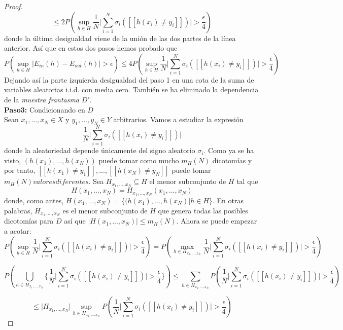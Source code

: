 \begin{proof}
\[ \leq 2P \left( \sup_{h \in H} \frac{1}{N} \bigg\vert \sum_{i=1}^{N} \sigma_{i} ( [[ h(x_{i}) \neq y_{i} ]])\bigg\vert > \frac{\epsilon}{4} \right)\]
donde la última desigualdad viene de la unión de las dos partes de la línea anterior. Así que en estos dos pasos hemos probado que
\[ P \left( \sup_{h \in H} \vert E_{in}(h)-E_{out}(h) \vert >\epsilon \right) \leq 4P \left( \sup_{h \in H} \frac{1}{N} \bigg\vert \sum_{i=1}^{N} \sigma_{i} ( [[ h(x_{i}) \neq y_{i} ]])\bigg\vert > \frac{\epsilon}{4} \right) \]
Dejando así la parte izquierda desigualdad del paso 1 en una cota de la suma de variables aleatorias i.i.d. con media cero. También se ha eliminado la dependencia de la \textit{muestra frantasma} $D'$.\\ 
\textbf{Paso3:} Condicionando en $D$\\
Sean $x_{1},...,x_{N} \in X$ y $y_{1},...,y_{N} \in Y$ arbitrarios. Vamos a estudiar la expresión
\[ \frac{1}{N} \bigg\vert \sum_{i=1}^{N} \sigma_{i} ( [[ h(x_{i}) \neq y_{i} ]])\bigg\vert \]
donde la aleatoriedad depende únicamente del signo aleatorio $\sigma_{i}$. Como ya se ha visto, $(h(x_{1}),..., h(x_{N}))$ puede tomar como mucho $m_{H}(N)$ dicotomías y por tanto, $[[ h(x_{1}) \neq y_{1} ]],...,[[ h(x_{N}) \neq y_{N} ]]$ puede tomar $m_{H}(N) valores diferentes$. Sea $H_{x_{1},...,x_{N}} \subseteq H$ el menor subconjunto de $H$ tal que
\[ H(x_{1},...,x_{N})=H_{x_{1},...,x_{N}}(x_{1},...,x_{N}) \]
donde, como antes, $H(x_{1},...,x_{N})= \lbrace (h(x_{1}),...,h(x_{N}) \vert h \in H \rbrace$. En otras palabras, $H_{x_{1},...,x_{N}}$ es el menor subconjunto de $H$ que genera todas las posibles dicotomías para $D$ así que $\vert H(x_{1},...,x_{N}) \vert \leq m_{H}(N)$. Ahora se puede empezar a acotar:\\
\[ P \left( \sup_{h \in H} \frac{1}{N} \bigg\vert \sum_{i=1}^{N} \sigma_{i} ( [[ h(x_{i}) \neq y_{i} ]])\bigg\vert > \frac{\epsilon}{4} \right) = P \left( \max_{h \in H_{x_{1},...,x_{N}}} \frac{1}{N} \bigg\vert \sum_{i=1}^{N} \sigma_{i} ( [[ h(x_{i}) \neq y_{i} ]])\bigg\vert > \frac{\epsilon}{4} \right)\]

\[ P \left( \bigcup\limits_{h \in H_{x_{1},...,x_{N}}} \bigg\lbrace \frac{1}{N} \bigg\vert \sum_{i=1}^{N} \sigma_{i} ( [[ h(x_{i}) \neq y_{i} ]])\bigg\vert > \frac{\epsilon}{4} \bigg\rbrace \right) 
\leq \sum_{h \in H_{x_{1},...,x_{N}}} P \left(  \frac{1}{N} \bigg\vert \sum_{i=1}^{N} \sigma_{i} ( [[ h(x_{i}) \neq y_{i} ]])\bigg\vert > \frac{\epsilon}{4}  \right) \]

\[ \leq \vert H_{x_{1},...,x_{N}} \vert \sup_{h \in H_{x_{1},...,x_{N}}} P \left(  \frac{1}{N} \bigg\vert \sum_{i=1}^{N} \sigma_{i} ( [[ h(x_{i}) \neq y_{i} ]])\bigg\vert > \frac{\epsilon}{4}  \right) \]


\end{proof}
